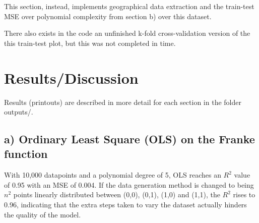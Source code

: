 \documentclass[a4paper, UKenglish]{article}
\newcommand{\0}{\mathbf{0}}
\newcommand{\1}{\mathbf{1}}
\begin{document}
This section, instead, implements geographical data extraction and the train-test MSE over polynomial complexity from section b) over this dataset.

There also exists in the code an unfinished k-fold cross-validation version of the this train-test plot, but this was not completed in time.






\section{Results/Discussion}
Results (printouts) are described in more detail for each section in the folder outputs/.
\subsection{a) Ordinary Least Square (OLS) on the Franke function}
With 10,000 datapoints and a polynomial degree of 5, OLS reaches an $R^2$ value of 0.95 with an MSE of 0.004. If the data generation method is changed to being $n^2$ points linearly distributed between (0,0), (0,1), (1,0) and (1,1), the $R^2$ rises to 0.96, indicating that the extra steps taken to vary the dataset actually hinders the quality of the model.
\end{document}
